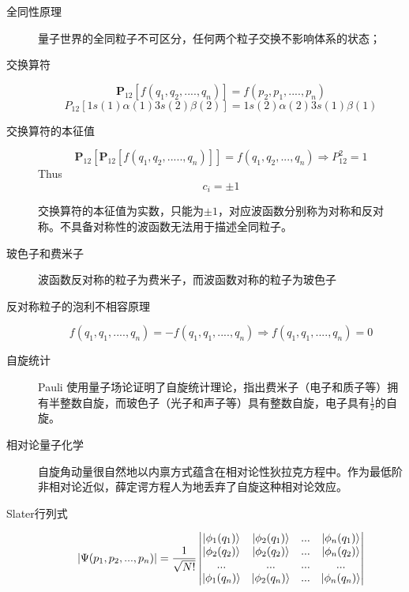 \begin{description}
	\item[全同性原理] 量子世界的全同粒子不可区分，任何两个粒子交换不影响体系的状态；

	\item[交换算符]
	\begin{equation}
	\textbf{P}_{12}[f(q_1,q_2,....,q_n)]=f(p_2,p_1,....,p_n)
	\end{equation}
	\begin{equation}
	P_{12}[1s(1)\alpha(1)3s(2)\beta(2)]=1s(2)\alpha(2)3s(1)\beta(1)
	\end{equation}

	\item[交换算符的本征值]
	\begin{equation}
	\textbf{P}_{12}[\textbf{P}_{12}[f(q_1,q_2,.....,q_n)]]=f(q_1,q_2,...,q_n)\Rightarrow P_{12}^2=1
	\end{equation}
	Thus
	\begin{equation}
	c_i=\pm 1
	\end{equation}

	交换算符的本征值为实数，只能为$\pm 1$，对应波函数分别称为对称和反对称。不具备对称性的波函数无法用于描述全同粒子。

	\item[玻色子和费米子] 波函数反对称的粒子为费米子，而波函数对称的粒子为玻色子

	\item[反对称粒子的泡利不相容原理]
	\begin{equation}
	f(q_1,q_1,....,q_n)=-f(q_1,q_1,....,q_n) \Rightarrow f(q_1,q_1,....,q_n)=0
	\end{equation}
	\item[自旋统计] Pauli 使用量子场论证明了自旋统计理论，指出费米子（电子和质子等）拥有半整数自旋，而玻色子（光子和声子等）具有整数自旋，电子具有$\frac{1}{2}$的自旋。

	\item[相对论量子化学] 自旋角动量很自然地以内禀方式蕴含在相对论性狄拉克方程中。作为最低阶非相对论近似，薛定谔方程人为地丢弃了自旋这种相对论效应。

	\item[Slater行列式]
	\begin{equation}
	|\Psi(p_1,p_2,...,p_n)|=\frac{1}{\sqrt{N!}}
	\begin{vmatrix}
	| \phi_1(q_1) \rangle & | \phi_2(q_1) \rangle & ... & | \phi_n(q_1) \rangle\\
	| \phi_2(q_2) \rangle & | \phi_2(q_2) \rangle & ... & | \phi_n(q_2) \rangle\\
	... & ...& ... & ...\\
	| \phi_1(q_n) \rangle & | \phi_2(q_n) \rangle & ... & | \phi_n(q_n) \rangle\\
	\end{vmatrix}
	\end{equation}


\end{description}
